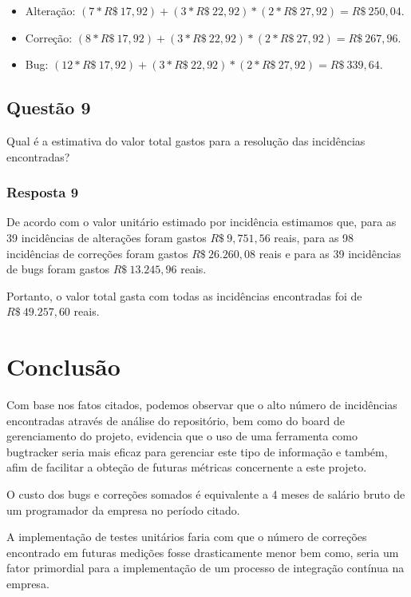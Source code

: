 \documentclass[11pt, a4paper]{article}
\begin{document}
\begin{itemize}
	\item Alteração: $(7 * R\$~17,92) +  (3 * R\$~22,92) * (2 * R\$~27,92) = R\$~250,04$.
	\item Correção: $(8 * R\$~17,92) +  (3 * R\$~22,92) * (2 * R\$~27,92) = R\$~267,96$.
	\item Bug: $(12 * R\$~17,92) +  (3 * R\$~22,92) * (2 * R\$~27,92) = R\$~339,64$.
\end{itemize}

\subsection{Questão 9}\label{sec:questao-9}
Qual é a estimativa do valor total gastos para a resolução das incidências encontradas?

\subsubsection{Resposta 9}
De acordo com o valor unitário estimado por incidência estimamos que, para as 39 incidências de alterações foram gastos $R\$~9,751,56$ reais, para as 98 incidências de correções foram gastos $R\$~26.260,08$ reais e para as 39 incidências de bugs foram gastos $R\$~13.245,96$ reais.

Portanto, o valor total gasta com todas as incidências encontradas foi de  $R\$~49.257,60$ reais.

\section{Conclusão}
Com base nos fatos citados, podemos observar que o alto número de incidências encontradas através de análise do repositório, bem como do board de gerenciamento do projeto, evidencia que o uso de uma ferramenta como bugtracker seria mais eficaz para gerenciar este tipo de informação e também, afim de facilitar a obteção de futuras métricas concernente a este projeto.

O custo dos bugs e correções somados é equivalente a 4 meses de salário bruto de um programador da empresa no período citado. 

A implementação de testes unitários faria com que o número de correções encontrado em futuras medições fosse drasticamente menor bem como, seria um fator primordial para a implementação de um processo de integração contínua na empresa.
\end{document}

